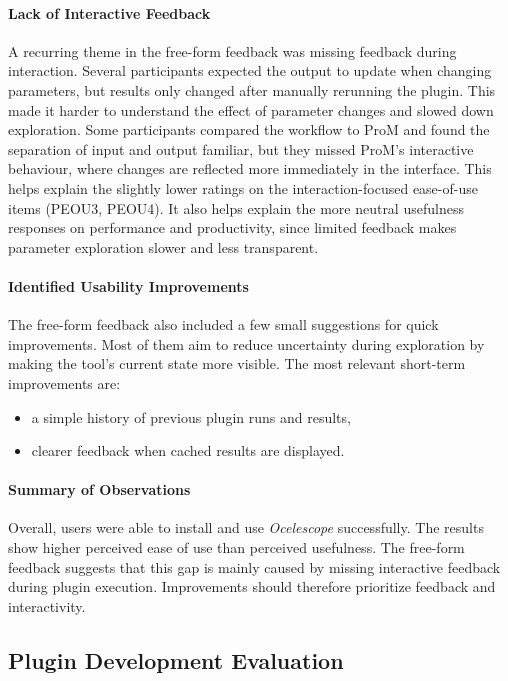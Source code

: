 \paragraph{Lack of Interactive Feedback}
A recurring theme in the free-form feedback was missing feedback during interaction. Several participants expected the output to update when changing parameters, but results only changed after manually rerunning the plugin. This made it harder to understand the effect of parameter changes and slowed down exploration.
Some participants compared the workflow to ProM and found the separation of input and output familiar, but they missed ProM's interactive behaviour, where changes are reflected more immediately in the interface.
This helps explain the slightly lower ratings on the interaction-focused ease-of-use items (PEOU3, PEOU4).
It also helps explain the more neutral usefulness responses on performance and productivity, since limited feedback makes parameter exploration slower and less transparent.

\paragraph{Identified Usability Improvements}
The free-form feedback also included a few small suggestions for quick improvements. Most of them aim to reduce uncertainty during exploration by making the tool's current state more visible. The most relevant short-term improvements are:

\begin{itemize}
	\item a simple history of previous plugin runs and results,
	\item clearer feedback when cached results are displayed.
\end{itemize}

\paragraph{Summary of Observations}
Overall, users were able to install and use \textit{Ocelescope} successfully. The results show higher perceived ease of use than perceived usefulness. The free-form feedback suggests that this gap is mainly caused by missing interactive feedback during plugin execution. Improvements should therefore prioritize feedback and interactivity.

\subsection{Plugin Development Evaluation}

